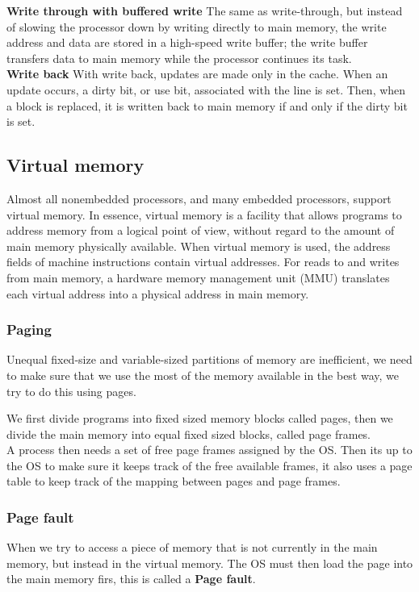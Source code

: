 \textbf{Write through with buffered write} The same as write-through, but instead of slowing the processor down by writing directly to main memory, the write address and data
are stored in a high-speed write buffer; the write buffer transfers data to main memory while the processor continues its task.\\

\textbf{Write back} With write back, updates are made only in the cache. When an update occurs, a dirty bit, or use bit, associated with the line is set. Then, when a block is replaced, it is written back to main memory if and only if the dirty bit is set. \\

\subsection{Virtual memory}
Almost all nonembedded processors, and many embedded processors, support virtual memory. In essence, virtual memory is a facility that allows programs to address memory from a logical point of view, without regard to the amount of main memory physically available. When virtual memory is used, the address fields of machine instructions contain virtual addresses. For reads to and writes from main memory, a hardware memory management unit (MMU) translates each virtual address into a physical address in main memory.

\subsubsection{Paging}
Unequal fixed-size and variable-sized partitions of memory are inefficient, we need to make sure that we use the most of the memory available in the best way, we try to do this using pages.

We first divide programs into fixed sized memory blocks called pages, then we divide the main memory into equal fixed sized blocks, called page frames. \\

A process then needs a set of free page frames assigned by the OS. Then its up to the OS to make sure it keeps track of the free available frames, it also uses a page table to keep track of the mapping between pages and page frames. 

\subsubsection{Page fault}
When we try to access a piece of memory that is not currently in the main memory, but instead in the virtual memory. The OS must then load the page into the main memory firs, this is called a \textbf{Page fault}.

